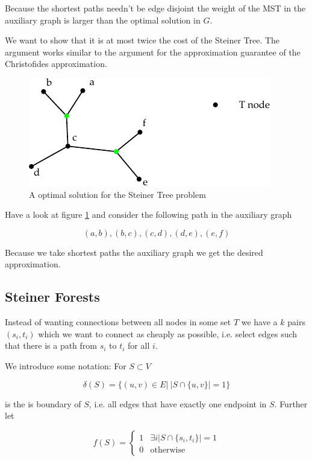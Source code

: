 Because the shortest paths needn't be edge disjoint the weight of the MST in the auxiliary graph is larger than the optimal solution in $G$.

We want to show that it is at most twice the cost of the Steiner Tree. The argument works similar to the argument for the approximation guarantee of the Christofides approximation.

\begin{figure}[hbt]
\begin{center}
\includegraphics{./images/steinerTree}
\end{center}
\caption{A optimal solution for the Steiner Tree problem}
\label{fig:steinerTree}
\end{figure}

Have a look at figure \ref{fig:steinerTree} and consider the following path in the auxiliary graph

\[(a,b),(b,c),(c,d),(d,e),(e,f)\]

Because we take shortest paths the auxiliary graph we get the desired approximation.

\subsection{Steiner Forests}

Instead of wanting connections between all nodes in some set $T$ we have a $k$ pairs $(s_i,t_i)$ which we want to connect as cheaply as possible, i.e. select edges such that there is a path from $s_i$ to $t_i$ for all $i$.

We introduce some notation: For $S\subset V$

\[\delta(S) = \{(u,v)\in E |\ |S\cap \{u,v\}| = 1\}\]

is the is boundary of $S$, i.e. all edges that have exactly one endpoint in $S$. Further let 

\[f(S) = \begin{cases}
1 & \exists i |S \cap \{s_i,t_i\}| =1\\
0 & \text{otherwise}
\end{cases}\]

